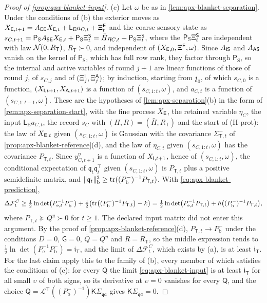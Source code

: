 \begin{proof}[Proof of \cref{prop:apx-blanket-input}]
(c) Let $\omega$ be as in \cref{lem:apx-blanket-separation}. Under the conditions of (b) the exterior moves as $X_{\mathsf{E},t+1}=A_{\mathsf{E}\mathsf{E}}X_{\mathsf{E},t}+\mathsf L_{\mathrm E}a_{C,t}+\Xi^{\mathsf{E}}_t$ and the coarse sensory state as $s_{C,t+1}=\mathsf P_{\mathrm S}A_{\mathsf{S}\mathsf{E}}X_{\mathsf{E},t}+\mathsf P_{\mathrm S}\Xi^{\mathsf{S}}_t=\bar H\eta_{C,t}+\mathsf P_{\mathrm S}\Xi^{\mathsf{S}}_t$, where the $\mathsf P_{\mathrm S}\Xi^{\mathsf{S}}_t$ are independent with law $\mathcal{N}(0,R_{\mathsf T})$, $R_{\mathsf T}\succ0$, and independent of $(X_{\mathsf{E},0},\Xi^{\mathsf{E}},\omega)$. Since $A_{\mathsf{I}\mathsf{S}}$ and $A_{\mathsf{A}\mathsf{S}}$ vanish on the kernel of $\mathsf P_{\mathrm S}$, which has full row rank, they factor through $\mathsf P_{\mathrm S}$, so the internal and active variables of round $j+1$ are linear functions of those of round $j$, of $s_{C,j}$ and of $(\Xi^{\mathsf{I}}_j,\Xi^{\mathsf{A}}_j)$; by induction, starting from $\mathfrak z_0$, of which $s_{C,0}$ is a function, $(X_{\mathsf{I},t+1},X_{\mathsf{A},t+1})$ is a function of $(s_{C,1:t},\omega)$, and $a_{C,t}$ is a function of $(s_{C,1:t-1},\omega)$. These are the hypotheses of \cref{lem:apx-separation}(b) in the form of \cref{rem:apx-separation-start}, with the fine process $X_{\mathsf{E}}$, the retained variable $\eta_C$, the input $\mathsf L_{\mathrm E}a_{C,t}$, the record $s_C$ with $(H,R)=(\bar H,R_{\mathsf T})$ and the start of (H-prot): the law of $X_{\mathsf{E},t}$ given $(s_{C,1:t},\omega)$ is Gaussian with the covariance $\Sigma^-_{\mathsf T,t}$ of \cref{prop:apx-blanket-reference}(d), and the law of $\eta_{C,t}$ given $(s_{C,1:t},\omega)$ has the covariance $P_{\mathsf T,t}$. Since $y^\eta_{C,t+1}$ is a function of $X_{\mathsf{I},t+1}$, hence of $(s_{C,1:t},\omega)$, the conditional expectation of $\mathfrak q_t\mathfrak q_t^\top$ given $(s_{C,1:t},\omega)$ is $P_{\mathsf T,t}$ plus a positive semidefinite matrix, and $\Vert\mathfrak q_t\Vert_{\mathrm b}^2\ge\operatorname{tr}((P^-_{\mathrm b})^{-1}P_{\mathsf T,t})$. With \eqref{eq:apx-blanket-prediction},
\begin{equation*}
\Delta\mathcal F^C_t\ge\tfrac12\ln\det\bigl(P_{\mathrm e,t}^{-1}P^-_{\mathrm b}\bigr)+\tfrac12\bigl(\operatorname{tr}\bigl((P^-_{\mathrm b})^{-1}P_{\mathsf T,t}\bigr)-k\bigr)=\tfrac12\ln\det\bigl(P_{\mathrm e,t}^{-1}P_{\mathsf T,t}\bigr)+h\bigl((P^-_{\mathrm b})^{-1}P_{\mathsf T,t}\bigr),
\end{equation*}
where $P_{\mathsf T,t}\succeq Q^y\succ0$ for $t\ge1$. The declared input matrix did not enter this argument. By the proof of \cref{prop:apx-blanket-reference}(d), $P_{\mathsf T,t}\to P^-_{\mathrm b}$ under the conditions $D=0$, $\mathsf G=0$, $\bar Q=Q^y$ and $\bar R=R_{\mathsf T}$, so the middle expression tends to $\frac12\ln\det(P_{\mathrm e}^{-1}P^-_{\mathrm b})=\mathfrak i_{\mathsf T}$, and the limit of $\Delta\mathcal F^C_t$, which exists by (a), is at least $\mathfrak i_{\mathsf T}$. For the last claim apply this to the family of (b), every member of which satisfies the conditions of (c): for every $\mathsf Q$ the limit \eqref{eq:apx-blanket-input} is at least $\mathfrak i_{\mathsf T}$ for all small $\upsilon$ of both signs, so its derivative at $\upsilon=0$ vanishes for every $\mathsf Q$, and the choice $\mathsf Q=\mathcal L^\top((P^-_{\mathrm b})^{-1})\mathsf K\Sigma_{\mathfrak qa}$ gives $\mathsf K\Sigma_{\mathfrak qa}=0$.

\end{proof}
